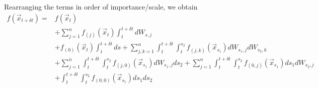 \documentclass[12pt]{article}
\begin{document}
%
Rearranging the terms in order of importance/scale, we obtain
\begin{equation} 
\begin{aligned}
f(\vec{x}_{t+\delta t}) =&
f(\vec{x}_t) \\
&+ \sum_{j=1}^n f_{(j)}(\vec{x}_t) \int_t^{t + \delta t} dW_{s,j} \\
&+  f_{(0)}(\vec{x}_t) \int_t^{t + \delta t} ds
+ \sum_{j, k=1}^n \int_t^{t+\delta t} \int_t^{s_2} f_{(j,k)}(\vec{x}_{s_1}) dW_{s_1, j} dW_{s_2, k} \\
&+ \sum_{j=1}^n \int_t^{t+\delta t} \int_t^{s_2} f_{(j,0)}(\vec{x}_{s_1}) dW_{s_1, j} ds_2 
+ \sum_{j=1}^n \int_t^{t+\delta t} \int_t^{s_2} f_{(0,j)}(\vec{x}_{s_1}) ds_1 dW_{s_2, j} \\
&+ \int_t^{t+\delta t} \int_t^{s_2} f_{(0,0)}(\vec{x}_{s_1}) ds_1 ds_2 
\end{aligned}
\end{equation}
\end{document}
